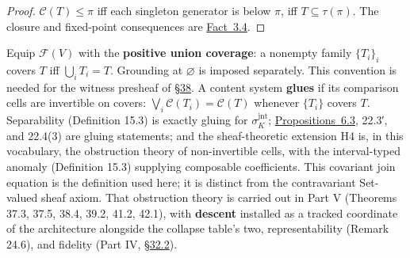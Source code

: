 \begin{proof}

\(\mathcal C(T)\le\pi\) iff each singleton generator is below \(\pi\), iff \(T\subseteq\tau(\pi)\). The closure and fixed-point consequences are \hyperlink{stmt:3.4}{Fact~3.4}.
\end{proof}

\begin{thmdef}

Equip \(\mathcal{F}(V)\) with the \textbf{positive union coverage}: a nonempty family \(\{T_i\}_i\) covers \(T\) iff \(\bigcup_i T_i = T\). Grounding at \(\varnothing\) is imposed separately. This convention is needed for the witness presheaf of \hyperlink{sec:38}{§38}. A content system \textbf{glues} if its comparison cells are invertible on covers: \(\bigvee_i \mathcal{C}(T_i) = \mathcal{C}(T)\) whenever \(\{T_i\}\) covers \(T\). Separability (Definition 15.3) is exactly gluing for \(\sigma^{\mathrm{jnt}}_K\); \hyperlink{stmt:6.3}{Propositions~6.3}, 22.3′, and 22.4(3) are gluing statements; and the sheaf-theoretic extension H4 is, in this vocabulary, the obstruction theory of non-invertible cells, with the interval-typed anomaly (Definition 15.3) supplying composable coefficients. This covariant join equation is the definition used here; it is distinct from the contravariant Set-valued sheaf axiom. That obstruction theory is carried out in Part V (Theorems 37.3, 37.5, 38.4, 39.2, 41.2, 42.1), with \textbf{descent} installed as a tracked coordinate of the architecture alongside the collapse table's two, representability (Remark 24.6), and fidelity (Part IV, \hyperlink{sec:32.2}{§32.2}).
\end{thmdef}

